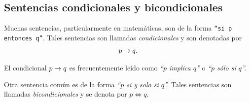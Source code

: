 \subsection{Sentencias condicionales y bicondicionales}


 Muchas sentencias, particularmente en matemáticas, son de la forma \texttt{``si p entonces q''}.  Tales sentencias son llamadas \emph{condicionales} y son denotadas por 
 $$
 p \rightarrow q.
 $$ 



 El condicional $p \rightarrow q$ es frecuentemente leído como \emph{``$p$ implica $q$''} o \emph{``$p$ sólo si $q$''.}



 Otra sentencia común es de la forma \emph{``$p$ si y solo si $q$''.}  Tales sentencias son llamadas \emph{bicondicionales} y se denota por 
 $
 p \iff q.
 $ 







